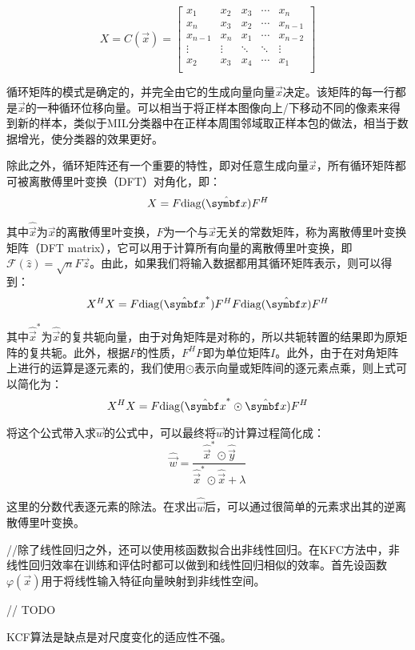 $$
X = C(\vec{x}) =
\left[
\begin{matrix}
 x_1      & x_2      & x_3      & \cdots & x_n     \\
 x_n      & x_3      & x_2      & \cdots & x_{n-1} \\
 x_{n-1}  & x_n      & x_1      & \cdots & x_{n-2} \\
 \vdots   & \vdots   & \ddots   & \ddots & \vdots  \\
 x_2      & x_3      & x_4      & \cdots & x_1     \\
\end{matrix}
\right]
$$

  循环矩阵的模式是确定的，并完全由它的生成向量向量$\vec{x}$决定。该矩阵的每一行都是$\vec{x}$的一种循环位移向量。可以相当于将正样本图像向上/下移动不同的像素来得到新的样本，类似于MIL分类器中在正样本周围邻域取正样本包的做法，相当于数据增光，使分类器的效果更好。

  除此之外，循环矩阵还有一个重要的特性，即对任意生成向量$\vec{x}$，所有循环矩阵都可被离散傅里叶变换（DFT）对角化，即：
$$X = F {\rm diag}(\hat{\vec{x}}) F^H$$

  其中$\hat{\vec{x}}$为$\vec{x}$的离散傅里叶变换，$F$为一个与$\vec{x}$无关的常数矩阵，称为离散傅里叶变换矩阵（DFT matrix），它可以用于计算所有向量的离散傅里叶变换，即$\mathcal{F}(\hat{z})=\sqrt{n}F\vec{z}$。由此，如果我们将输入数据都用其循环矩阵表示，则可以得到：
$$X^HX = F {\rm diag}(\hat{\vec{x}}^\ast)F^H F {\rm diag}(\hat{\vec{x}})F^H$$

  其中$\hat{\vec{x}}^\ast$为$\hat{\vec{x}}$的复共轭向量，由于对角矩阵是对称的，所以共轭转置的结果即为原矩阵的复共轭。此外，根据$F$的性质，$F^H F $即为单位矩阵$I$。此外，由于在对角矩阵上进行的运算是逐元素的，我们使用$\odot$表示向量或矩阵间的逐元素点乘，则上式可以简化为：
$$X^HX = F {\rm diag}(\hat{\vec{x}}^\ast \odot \hat{\vec{x}}) F^H$$

  将这个公式带入求$\vec{w}$的公式中，可以最终将$\vec{w}$的计算过程简化成：
$$\hat{\vec{w}}=\frac{\hat{\vec{x}}^\ast \odot \hat{\vec{y}}}{\hat{\vec{x}}^\ast \odot \hat{\vec{x}}+\lambda}$$

  这里的分数代表逐元素的除法。在求出$\hat{\vec{w}}$后，可以通过很简单的元素求出其的逆离散傅里叶变换。

  //除了线性回归之外，还可以使用核函数拟合出非线性回归。在KFC方法中，非线性回归效率在训练和评估时都可以做到和线性回归相似的效率。首先设函数$\varphi(\vec{x})$用于将线性输入特征向量映射到非线性空间。

// TODO

  KCF算法是缺点是对尺度变化的适应性不强。

